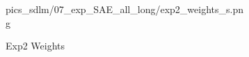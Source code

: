 \begin{figure}
\begin{subfigure}[c]{0.48\textwidth}
{			{pics_sdlm/07_exp_SAE_all_long/exp2_weights_s.png}}
		\caption{Exp2 Weights}
	\end{subfigure}%
	\hspace{1em}
	\begin{subfigure}[c]{0.48\textwidth}\raggedleft
		\\
		\\
\end{subfigure}
\end{figure}
